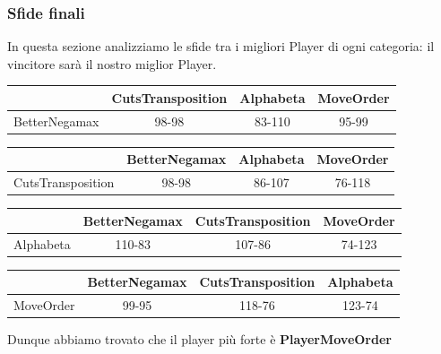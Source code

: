 \documentclass{article}
\begin{document}
\subsubsection{Sfide finali}
In questa sezione analizziamo le sfide tra i migliori Player di ogni categoria: il vincitore sarà il nostro miglior Player.
\begin{center}
    \begin{table}[htpb]
    \centering
        \begin{tabular}{||c | c | c | c ||}
             \hline
                & CutsTransposition & Alphabeta & MoveOrder \\
             \hline\hline
             BetterNegamax & \cellcolor{yellow}98-98 &\cellcolor{red} 83-110 &\cellcolor{red} 95-99 \\
             \hline
        \end{tabular}
    \end{table}
\end{center}
\begin{center}
    \begin{table}[htpb]
    \centering
        \begin{tabular}{||c | c | c | c ||}
             \hline
                & BetterNegamax & Alphabeta & MoveOrder \\
             \hline\hline
             CutsTransposition & \cellcolor{yellow}98-98 &\cellcolor{red} 86-107 &\cellcolor{red} 76-118 \\
             \hline
        \end{tabular}
    \end{table}
\end{center}
\begin{center}
    \begin{table}[htpb]
    \centering
        \begin{tabular}{||c | c | c | c ||}
             \hline
                & BetterNegamax & CutsTransposition & MoveOrder \\
             \hline\hline
             Alphabeta & \cellcolor{green} 110-83 &\cellcolor{green} 107-86 &\cellcolor{red} 74-123 \\
             \hline
        \end{tabular}
    \end{table}
\end{center}
\begin{center}
    \begin{table}[htpb]
    \centering
        \begin{tabular}{||c | c | c | c ||}
             \hline
                & BetterNegamax & CutsTransposition & Alphabeta \\
             \hline\hline
             MoveOrder & \cellcolor{green}99-95 &\cellcolor{green} 118-76 &\cellcolor{green} 123-74 \\
             \hline
        \end{tabular}
    \end{table}
\end{center}
\newpage
Dunque abbiamo trovato che il player più forte è \textbf{PlayerMoveOrder}
\end{document}
